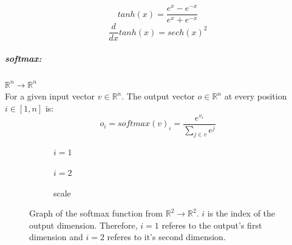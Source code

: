 \documentclass[12pt]{article}
\begin{document}
\begin{center}

\end{center}

\begin{equation} \label{eq:NN:tanh}
tanh(x) = \frac{e^x-e^{-x}}{e^x+e^{-x}}
\end{equation}\begin{equation} \label{eq:NN:tanh_derivative}
\frac{d}{dx}tanh(x) = sech(x)^2
\end{equation}
\subparagraph*{softmax:} \(\mathbb{R}^n\to \mathbb{R}^n\)\\
\indent For a given input vector \(v \in \mathbb{R}^n\). The output vector \(o \in \mathbb{R}^n\) at every position \(i \in [1, n]\) is:
\begin{equation} \label{eq:NN:softmax}
o_i = softmax(v)_i = \frac{e^{v_i}}{\sum_{j \in v} e^j}
\end{equation}
\begin{figure}[H]
\centering
\begin{subfigure}{.4\textwidth}
  \centering
  
  \caption{\(i=1\)}
  \label{fig:sub1}
\end{subfigure}%
\begin{subfigure}{.4\textwidth}
  \centering
  
  \caption{\(i=2\)}
  \label{fig:sub2}
\end{subfigure}
\begin{subfigure}{.1\textwidth}
  \centering
  
  \caption*{scale}
\end{subfigure}
\caption{Graph of the softmax function from \(\mathbb R^2 \to \mathbb R^2\). \(i\) is the index of the output dimension. Therefore, \(i=1\) referes to the output's first dimension and \(i=2\) referes to it's second dimension.}
\label{fig:test}
\end{figure}
\end{document}
